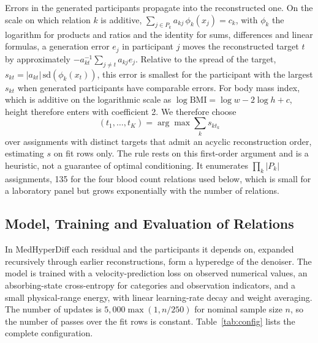 \documentclass[conference]{IEEEtran}
\begin{document}
Errors in the generated participants propagate into the reconstructed one. On the scale on which relation $k$ is additive, $\sum_{j \in P_k} a_{kj}\, \phi_k(x_j) = c_k$, with $\phi_k$ the logarithm for products and ratios and the identity for sums, differences and linear formulas, a generation error $e_j$ in participant $j$ moves the reconstructed target $t$ by approximately $-a_{kt}^{-1} \sum_{j \ne t} a_{kj} e_j$. Relative to the spread of the target, $s_{kt} = |a_{kt}|\, \mathrm{sd}(\phi_k(x_t))$, this error is smallest for the participant with the largest $s_{kt}$ when generated participants have comparable errors. For body mass index, which is additive on the logarithmic scale as $\log \mathrm{BMI} = \log w - 2\log h + c$, height therefore enters with coefficient 2. We therefore choose
\begin{equation}
(t_1, \dots, t_K) = \arg\max \textstyle\sum_{k} s_{k t_k}
\label{eq:choice}
\end{equation}
over assignments with distinct targets that admit an acyclic reconstruction order, estimating $s$ on fit rows only. The rule rests on this first-order argument and is a heuristic, not a guarantee of optimal conditioning. It enumerates $\prod_k |P_k|$ assignments, 135 for the four blood count relations used below, which is small for a laboratory panel but grows exponentially with the number of relations.

\subsection*{Model, Training and Evaluation of Relations}

In MedHyperDiff each residual and the participants it depends on, expanded recursively through earlier reconstructions, form a hyperedge of the denoiser. The model is trained with a velocity-prediction loss on observed numerical values, an absorbing-state cross-entropy for categories and observation indicators, and a small physical-range energy, with linear learning-rate decay and weight averaging. The number of updates is $5{,}000 \max(1, n/250)$ for nominal sample size $n$, so the number of passes over the fit rows is constant. Table~\ref{tab:config} lists the complete configuration.
\end{document}
